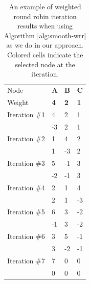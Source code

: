 \documentclass[draft,final]{vutinfth} %
\begin{document}
\begin{table}[]
\centering
\begin{tabular}{llll}
Node          & \textbf{A}                & \textbf{B}                & \textbf{C}                \\
Weight        & \textbf{4}                & \textbf{2}                & \textbf{1}                \\ \hline
Iteration \#1 & \cellcolor[HTML]{FFCE93}4 & 2                         & 1                         \\
              & -3                        & 2                         & 1                         \\ \hline
Iteration \#2 & 1                         & \cellcolor[HTML]{FFCE93}4 & 2                         \\
              & 1                         & -3                        & 2                         \\ \hline
Iteration \#3 & \cellcolor[HTML]{FFCE93}5 & -1                        & 3                         \\
              & -2                        & -1                        & 3                         \\ \hline
Iteration \#4 & 2                         & 1                         & \cellcolor[HTML]{FFCE93}4 \\
              & 2                         & 1                         & -3                        \\ \hline
Iteration \#5 & \cellcolor[HTML]{FFCE93}6 & 3                         & -2                        \\
              & -1                        & 3                         & -2                        \\ \hline
Iteration \#6 & 3                         & \cellcolor[HTML]{FFCE93}5 & -1                        \\
              & 3                         & -2                        & -1                        \\ \hline
Iteration \#7 & \cellcolor[HTML]{FFCE93}7 & 0                         & 0                         \\
              & 0                         & 0                         & 0                        
\end{tabular}
\caption{An example of weighted round robin iteration results when using Algorithm \ref{alg:smooth-wrr} as we do in our approach. Colored cells indicate the selected node at the iteration.}
\label{tab:smooth-wrr-demo}
\end{table}
\end{document}

